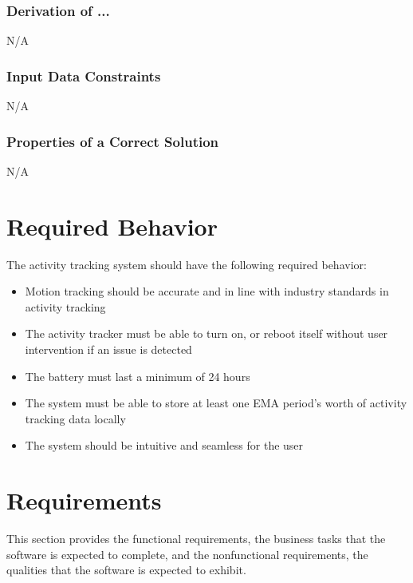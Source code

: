 \documentclass[12pt]{article}
\begin{document}
\subsubsection*{Derivation of ...}
N/A

\subsubsection{Input Data Constraints} \label{sec_DataConstraints}
N/A


\subsubsection{Properties of a Correct Solution} \label{sec_CorrectSolution}
N/A


\section{Required Behavior}
\label{Req_Behavior}
The activity tracking system should have the following required behavior: \\

\begin{itemize}
\item Motion tracking should be accurate and in line with industry standards in activity tracking\\
\item The activity tracker must be able to turn on, or reboot itself without user intervention if an issue is detected\\
\item The battery must last a minimum of 24 hours\\
\item The system must be able to store at least one EMA period's worth of activity tracking data locally\\
\item The system should be intuitive and seamless for the user\\
\end{itemize} 
\newpage
\section{Requirements}
\label{Requirements}
This section provides the functional requirements, the business tasks that the
software is expected to complete, and the nonfunctional requirements, the
qualities that the software is expected to exhibit.
\end{document}

